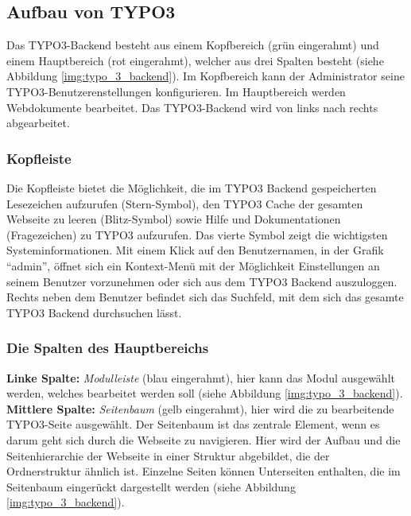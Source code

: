 \subsection{Aufbau von TYPO3}

Das TYPO3-Backend besteht aus einem Kopfbereich (grün eingerahmt) und einem Hauptbereich (rot eingerahmt), welcher aus drei Spalten besteht (siehe Abbildung \ref{img:typo_3_backend}). Im Kopfbereich kann der Administrator seine TYPO3-Benutzerenstellungen konfigurieren. Im Hauptbereich werden Webdokumente bearbeitet. Das TYPO3-Backend wird von links nach rechts abgearbeitet.

\subsubsection{Kopfleiste}

Die Kopfleiste bietet die Möglichkeit, die im TYPO3 Backend gespeicherten Lesezeichen aufzurufen (Stern-Symbol), den TYPO3 Cache der gesamten Webseite zu leeren (Blitz-Symbol) sowie Hilfe und Dokumentationen (Fragezeichen) zu TYPO3 aufzurufen. Das vierte Symbol zeigt die wichtigsten Systeminformationen. Mit einem Klick auf den Benutzernamen, in der Grafik “admin”, öffnet sich ein Kontext-Menü mit der Möglichkeit Einstellungen an seinem Benutzer vorzunehmen oder sich aus dem TYPO3 Backend auszuloggen. Rechts neben dem Benutzer befindet sich das Suchfeld, mit dem sich das gesamte TYPO3 Backend durchsuchen lässt.

\subsubsection{Die Spalten des Hauptbereichs}

\textbf{Linke Spalte:} \textit{Modulleiste} (blau eingerahmt), hier kann das Modul ausgewählt werden, welches bearbeitet werden soll (siehe Abbildung \ref{img:typo_3_backend}).\\

\textbf{Mittlere Spalte:} \textit{Seitenbaum} (gelb eingerahmt), hier wird die zu bearbeitende TYPO3-Seite ausgewählt. Der Seitenbaum ist das zentrale Element, wenn es darum geht sich durch die Webseite zu navigieren. Hier wird der Aufbau und die Seitenhierarchie der Webseite in einer Struktur abgebildet, die der Ordnerstruktur ähnlich ist. Einzelne Seiten können Unterseiten enthalten, die im Seitenbaum eingerückt dargestellt werden (siehe Abbildung \ref{img:typo_3_backend}).\\

